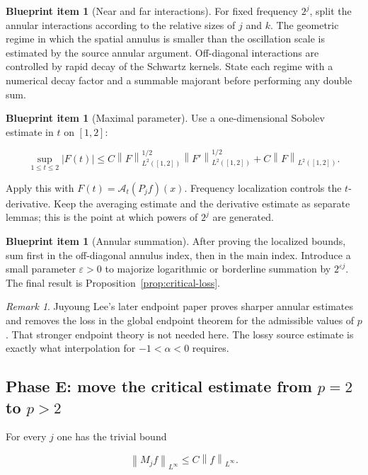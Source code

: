 \documentclass[11pt,a4paper]{article}
\theoremstyle{definition}
\newtheorem{blueprint}[theorem]{Blueprint item}
\theoremstyle{remark}
\newtheorem{remark}[theorem]{Remark}
\newcommand{\A}{\mathcal{A}}
\newcommand{\norm}[1]{\left\lVert #1\right\rVert}
\newcommand{\abs}[1]{\left\lvert #1\right\rvert}
\begin{document}
\begin{blueprint}[Near and far interactions]
For fixed frequency $2^j$, split the annular interactions according to the
relative sizes of $j$ and $k$.  The geometric regime in which the spatial
annulus is smaller than the oscillation scale is estimated by the source
annular argument.  Off-diagonal interactions are controlled by rapid decay of
the Schwartz kernels.  State each regime with a numerical decay factor and a
summable majorant before performing any double sum.
\end{blueprint}

\begin{blueprint}[Maximal parameter]
Use a one-dimensional Sobolev estimate in $t$ on $[1,2]$:

\[
\sup_{1\leq t\leq2}\abs{F(t)}
\leq
C\norm{F}_{L^2([1,2])}^{1/2}
\norm{F'}_{L^2([1,2])}^{1/2}
+
C\norm{F}_{L^2([1,2])}.
\]

Apply this with $F(t)=\A_t(P_jf)(x)$.  Frequency localization controls the
$t$-derivative.  Keep the averaging estimate and the derivative estimate as
separate lemmas; this is the point at which powers of $2^j$ are generated.
\end{blueprint}

\begin{blueprint}[Annular summation]
After proving the localized bounds, sum first in the off-diagonal annulus
index, then in the main index.  Introduce a small parameter $\varepsilon>0$ to
majorize logarithmic or borderline summation by $2^{\varepsilon j}$.  The final
result is Proposition~\ref{prop:critical-loss}.
\end{blueprint}

\begin{remark}
Juyoung Lee's later endpoint paper proves sharper annular estimates and removes
the loss in the global endpoint theorem for the admissible values of $p$.  That
stronger endpoint theory is not needed here.  The lossy source estimate is
exactly what interpolation for $-1<\alpha<0$ requires.
\end{remark}

\subsection{Phase E: move the critical estimate from $p=2$ to $p>2$}

For every $j$ one has the trivial bound

\[
\norm{M_jf}_{L^\infty}
\leq C\norm{f}_{L^\infty}.
\]
\end{document}
